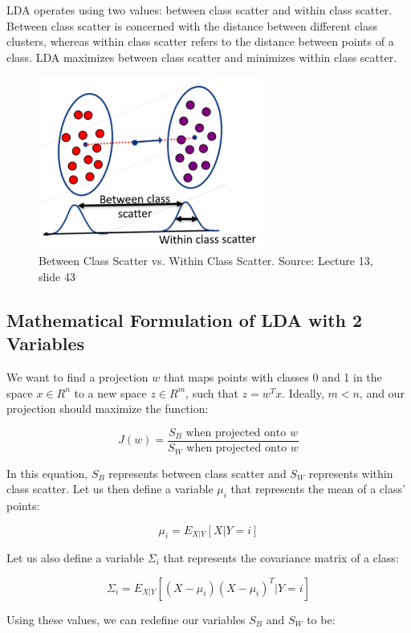 \documentclass{article}
\begin{document}
LDA operates using two values: between class scatter and within class scatter. Between class scatter is concerned with the distance between different class clusters, whereas within class scatter refers to the distance between points of a class. LDA maximizes between class scatter and minimizes within class scatter.

\begin{figure}[H]
  \centering
  \includegraphics[width=0.65\textwidth]{between-within-scatters}
  \caption{Between Class Scatter vs. Within Class Scatter. Source: Lecture 13, slide 43}
\end{figure}

\subsection{Mathematical Formulation of LDA with 2 Variables}

We want to find a projection $w$ that maps points with classes 0 and 1 in the space $x \in R^n$ to a new space $z \in R^m$, such that $z = w^{T}x$. Ideally, $m < n$, and our projection should maximize the function: 

$$J(w) = \frac{S_B\text{ when projected onto }w}{S_W\text{ when projected onto }w}$$ 

In this equation, $S_B$ represents between class scatter and $S_W$ represents within class scatter. Let us then define a variable $\mu_i$ that represents the mean of a class' points:

$$\mu_i = E_{X|Y}[X|Y=i]$$

Let us also define a variable $\Sigma_i$ that represents the covariance matrix of a class: 

$$\Sigma_i = E_{X|Y}[(X-\mu_i)(X-\mu_i)^T|Y=i]$$

Using these values, we can redefine our variables $S_B$ and $S_W$ to be:
\end{document}
